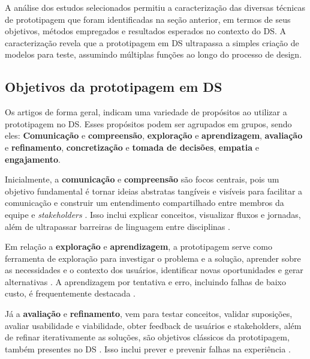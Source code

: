A análise dos estudos selecionados permitiu a caracterização das diversas técnicas de prototipagem que foram identificadas na seção anterior, em termos de seus objetivos, métodos empregados e resultados esperados no contexto do DS. A caracterização revela que a prototipagem em DS ultrapassa a simples criação de modelos para teste, assumindo múltiplas funções ao longo do processo de design.

\subsection{Objetivos da prototipagem em DS}

Os artigos de forma geral, indicam uma variedade de propósitos ao utilizar a prototipagem no DS. Esses propósitos podem ser agrupados em grupos, sendo eles: \textbf{Comunicação} e \textbf{compreensão}, \textbf{exploração} e \textbf{aprendizagem}, \textbf{avaliação} e \textbf{refinamento}, \textbf{concretização} e \textbf{tomada de decisões}, \textbf{empatia} e \textbf{engajamento}.

Inicialmente, a \textbf{comunicação} e \textbf{compreensão} são focos centrais, pois um objetivo fundamental é tornar ideias abstratas tangíveis e visíveis para facilitar a comunicação e construir um entendimento compartilhado entre membros da equipe e \textit{stakeholders} \cite{paust2025integrative, mager2023product, soto2023prototyping, lee2023industry}. Isso inclui explicar conceitos, visualizar fluxos e jornadas, além de ultrapassar barreiras de linguagem entre disciplinas \cite{paust2025integrative, wang2023smartproducts}.

Em relação a \textbf{exploração} e \textbf{aprendizagem}, a prototipagem serve como ferramenta de exploração para investigar o problema e a solução, aprender sobre as necessidades e o contexto dos usuários, identificar novas oportunidades e gerar alternativas \cite{paust2025integrative, mager2023product, soto2023prototyping, you2022applying, dehmel2021weather, lambe2022capabilities}. A aprendizagem por tentativa e erro, incluindo falhas de baixo custo, é frequentemente destacada \cite{paust2025integrative, soto2023prototyping, you2022applying}.

Já a \textbf{avaliação} e \textbf{refinamento}, vem para testar conceitos, validar suposições, avaliar usabilidade e viabilidade, obter feedback de usuários e stakeholders, além de refinar iterativamente as soluções, são objetivos clássicos da prototipagem, também presentes no DS \cite{paust2025integrative, hegemann2024palette, quintero2021interdisciplinary, mager2023product, Vieira2025, asbjornsen2022echange, villa2022integratedcare}. Isso inclui prever e prevenir falhas na experiência \cite{mager2023product}.

